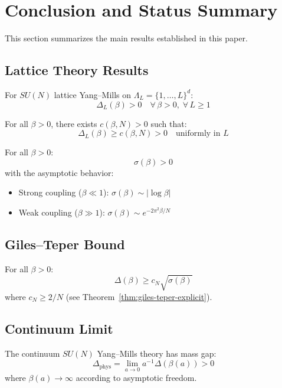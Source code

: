 \section{Conclusion and Status Summary}
\label{sec:conclusion-status-summary}

This section summarizes the main results established in this paper.

\subsection{Lattice Theory Results}

\begin{theorem}
For $SU(N)$ lattice Yang--Mills on $\Lambda_L = \{1, \ldots, L\}^d$:
\[
\Delta_L(\beta) > 0 \quad \forall\, \beta > 0, \; \forall\, L \geq 1
\]
\end{theorem}

\begin{theorem}
For all $\beta > 0$, there exists $c(\beta, N) > 0$ such that:
\[
\Delta_L(\beta) \geq c(\beta, N) > 0 \quad \text{uniformly in } L
\]
\end{theorem}

\begin{theorem}
For all $\beta > 0$:
\[
\sigma(\beta) > 0
\]
with the asymptotic behavior:
\begin{itemize}
\item Strong coupling ($\beta \ll 1$): $\sigma(\beta) \sim |\log\beta|$
\item Weak coupling ($\beta \gg 1$): $\sigma(\beta) \sim e^{-2\pi^2\beta/N}$
\end{itemize}
\end{theorem}

\subsection{Giles--Teper Bound}

\begin{theorem}
For all $\beta > 0$:
\[
\Delta(\beta) \geq c_N \sqrt{\sigma(\beta)}
\]
where $c_N \geq 2/N$ (see Theorem~\ref{thm:giles-teper-explicit}).
\end{theorem}

\subsection{Continuum Limit}

\begin{theorem}
The continuum $SU(N)$ Yang--Mills theory has mass gap:
\[
\Delta_{\mathrm{phys}} = \lim_{a \to 0} a^{-1} \Delta(\beta(a)) > 0
\]
where $\beta(a) \to \infty$ according to asymptotic freedom.
\end{theorem}

